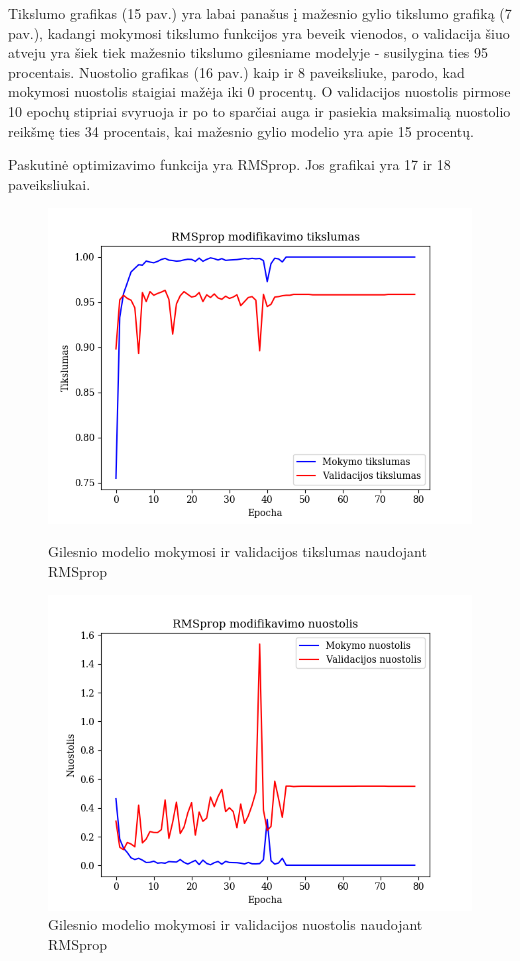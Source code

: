 \documentclass{VUMIFPSkursinis}
\begin{document}
Tikslumo grafikas (15 pav.) yra labai panašus į mažesnio gylio tikslumo grafiką (7 pav.), kadangi mokymosi tikslumo funkcijos yra beveik vienodos, o validacija šiuo atveju yra šiek tiek mažesnio tikslumo gilesniame 
modelyje - susilygina ties 95 procentais.
Nuostolio grafikas (16 pav.) kaip ir 8 paveiksliuke, parodo, kad mokymosi nuostolis staigiai mažėja iki 0 procentų. O validacijos nuostolis pirmose 10 epochų stipriai svyruoja ir po to sparčiai auga ir pasiekia maksimalią nuostolio 
reikšmę ties 34 procentais, kai mažesnio gylio modelio yra apie 15 procentų.

Paskutinė optimizavimo funkcija yra RMSprop. Jos grafikai yra 17 ir 18 paveiksliukai.

\begin{figure}[!htbp]
  \centering
  \begin{minipage}[b]{0.49\textwidth}
    \includegraphics[width=\textwidth]{img/AL/RMSprop_acc.png}
    \caption{Gilesnio modelio mokymosi ir validacijos tikslumas naudojant RMSprop}
  \end{minipage}
  \begin{minipage}[b]{0.49\textwidth}
    \includegraphics[width=\textwidth]{img/AL/RMSprop_loss.png}
    \caption{Gilesnio modelio mokymosi ir validacijos nuostolis naudojant RMSprop}
  \end{minipage}
\end{figure}
\end{document}

